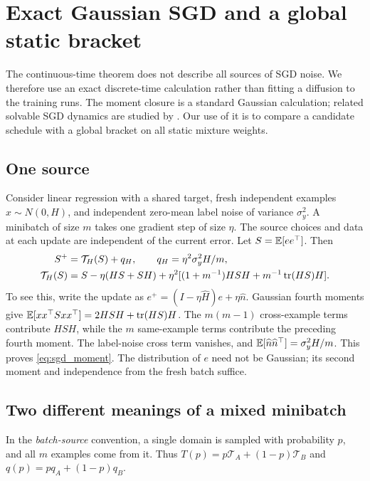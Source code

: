 \section{Exact Gaussian SGD and a global static bracket}\label{app:moments}
The continuous-time theorem does not describe all sources of SGD noise. We therefore use an exact discrete-time calculation rather than fitting a diffusion to the training runs. The moment closure is a standard Gaussian calculation; related solvable SGD dynamics are studied by \citet{bordelon2022}. Our use of it is to compare a candidate schedule with a global bracket on all static mixture weights.

\subsection{One source}
Consider linear regression with a shared target, fresh independent examples $x\sim N(0,H)$, and independent zero-mean label noise of variance $\sigma_y^2$. A minibatch of size $m$ takes one gradient step of size $\eta$. The source choices and data at each update are independent of the current error. Let $S=\mathbb E[ee^\top]$. Then
\begin{align}
 S^+&=\mathcal T_H(S)+q_H,\qquad q_H=\eta^2\sigma_y^2H/m,\nonumber\\
 \mathcal T_H(S)&=S-\eta(HS+SH)+\eta^2[(1+m^{-1})HSH+m^{-1}\operatorname{tr}(HS)H].\label{eq:sgd_moment}
\end{align}
To see this, write the update as $e^+=(I-\eta\widehat H)e+\eta\widehat n$. Gaussian fourth moments give
$\mathbb E[xx^\top Sxx^\top]=2HSH+\operatorname{tr}(HS)H$. The $m(m-1)$ cross-example terms contribute $HSH$, while the $m$ same-example terms contribute the preceding fourth moment. The label-noise cross term vanishes, and $\mathbb E[\widehat n\widehat n^\top]=\sigma_y^2H/m$. This proves \eqref{eq:sgd_moment}. The distribution of $e$ need not be Gaussian; its second moment and independence from the fresh batch suffice.

\subsection{Two different meanings of a mixed minibatch}
In the \emph{batch-source} convention, a single domain is sampled with probability $p$, and all $m$ examples come from it. Thus $T(p)=p\mathcal T_A+(1-p)\mathcal T_B$ and $q(p)=pq_A+(1-p)q_B$.

